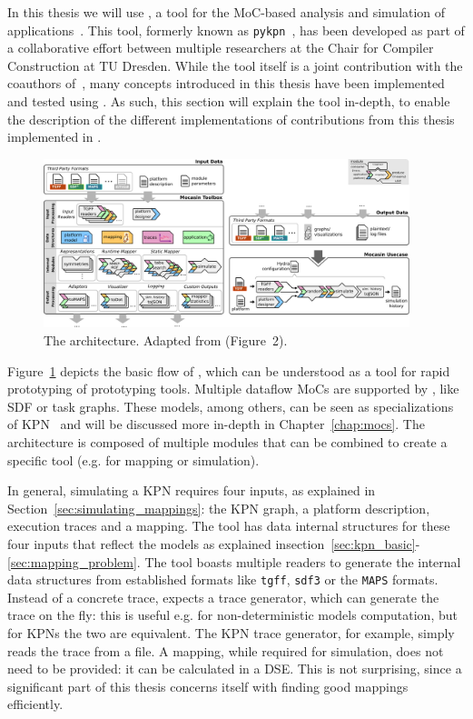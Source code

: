 In this thesis we will use \mocasin, a tool for the \ac{MoC}-based analysis and simulation of applications~\cite{menard_rapido21}.
This tool, formerly known as \texttt{pykpn}~\cite{menard_norcas16,goens_mcsoc18}, has been developed as part of a collaborative effort between multiple researchers at the Chair for Compiler Construction at TU Dresden.
While the tool itself is a joint contribution with the coauthors of~\cite{menard_rapido21}, many concepts introduced in this thesis have been implemented and tested using \mocasin.
As such, this section will explain the tool in-depth, to enable the description of the different implementations of contributions from this thesis implemented in \mocasin.

\begin{figure}[h]
	\centering
   \includegraphics[width=0.95\textwidth]{figures/mocasin.pdf}
	\caption{The \mocasin architecture. Adapted from \cite{menard_rapido21} (Figure~2).}
	\label{fig:mocasin_arch}
\end{figure}


Figure~\ref{fig:mocasin_arch} depicts the basic flow of \mocasin,
which can be understood as a tool for rapid prototyping of prototyping tools.
Multiple dataflow \acp{MoC} are supported by \mocasin, like \ac{SDF} or task graphs.
These models, among others, can be seen as specializations of \ac{KPN}~\cite{lee1995dataflow} and will be discussed more in-depth in Chapter~\ref{chap:mocs}.
The \mocasin architecture is composed of multiple modules that can be combined to create a specific tool (e.g. for mapping or simulation). 

In general, simulating a KPN requires four inputs, as explained in Section~\ref{sec:simulating_mappings}: the \ac{KPN} graph, a platform description, execution traces and a mapping.
The \mocasin tool has data internal structures for these four inputs that reflect the models as explained insection~\ref{sec:kpn_basic}-\ref{sec:mapping_problem}.
The tool boasts multiple readers to generate the internal data structures from established formats like \texttt{tgff}, \texttt{sdf3} or the \texttt{MAPS} formats. \index{\acs*{\SDFFF}}
Instead of a concrete trace, \mocasin expects a trace generator, which can generate the trace on the fly: this is useful e.g. for non-deterministic models computation, but for KPNs the two are equivalent.
The \ac{KPN} trace generator, for example, simply reads the trace from a file.
A mapping, while required for simulation, does not need to be provided: it can be calculated in a \acl{DSE}.
This is not surprising, since a significant part of this thesis concerns itself with finding good mappings efficiently.

